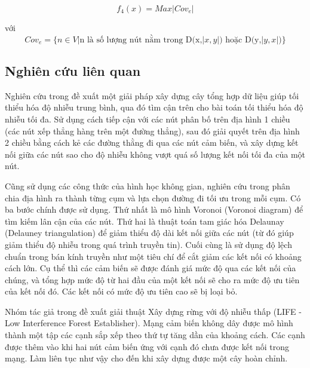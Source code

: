 \begin{equation}
f_4(x) = Max|Cov_e|
\end{equation}

với $$Cov_e = \{n \in V | \text{n là số lượng nút nằm trong D(x,$|x,y|$) hoặc D(y,$|y,x|$)} \}$$
\subsection{Nghiên cứu liên quan}
Nghiên cứu trong \cite{lou2011minimizing} đề xuất một giải pháp xây dựng cây tổng hợp dữ liệu giúp tối thiểu hóa độ nhiễu trung bình, qua đó tìm cận trên cho bài toán tối thiểu hóa độ nhiễu tối đa. Sử dụng cách tiếp cận với các nút phân bố trên địa hình 1 chiều (các nút xếp thẳng hàng trên một đường thẳng), sau đó giải quyết trên địa hình 2 chiều bằng cách kẻ các đường thằng đi qua các nút cảm biến, và xây dựng kết nối giữa các nút sao cho độ nhiễu không vượt quá số lượng kết nối tối đa của một nút.


Cũng sử dụng các công thức của hình học không gian, nghiên cứu trong \cite{jang2010applications} phân chia địa hình ra thành từng cụm và lựa chọn đường đi tối ưu trong mỗi cụm. Có ba bước chính được sử dụng. Thứ nhất là mô hình Voronoi (Voronoi diagram) để tìm kiếm lân cận của các nút. Thứ hai là thuật toán tam giác hóa Delaunay (Delauney triangulation) để giảm thiểu độ dài kết nối giữa các nút (từ đó giúp giảm thiểu độ nhiễu trong quá trình truyền tin). Cuối cùng là sử dụng độ lệch chuẩn trong bán kính truyền như một tiêu chí để cắt giảm các kết nối có khoảng cách lớn. Cụ thể thì các cảm biến sẽ được đánh giá mức độ qua các kết nối của chúng, và tổng hợp mức độ từ hai đầu của một kết nối sẽ cho ra mức độ ưu tiên của kết nối đó. Các kết nối có mức độ ưu tiên cao sẽ bị loại bỏ.


Nhóm tác giả trong \cite{burkhart2004does} đề xuất giải thuật Xây dựng rừng với độ nhiễu thấp (LIFE - Low Interference Forest Establisher). Mạng cảm biến không dây được mô hình thành một tập các cạnh sắp xếp theo thứ tự tăng dần của khoảng cách. Các cạnh được thêm vào khi hai nút cảm biến ứng với cạnh đó chưa được kết nối trong mạng. Làm liên tục như vậy cho đến khi xây dựng được một cây hoàn chỉnh.
